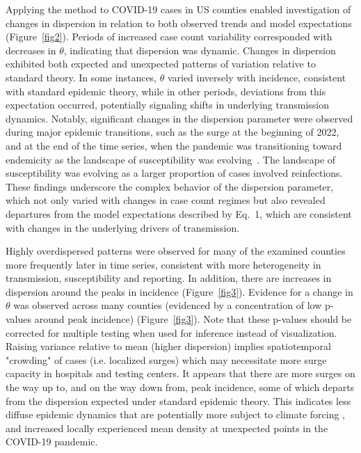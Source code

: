 \documentclass[11pt,letterpaper]{article}
\begin{document}
\begin{Abstract}
Applying the method to COVID-19 cases in US counties enabled investigation of changes in dispersion in relation to both observed trends and model expectations (Figure~\ref{fig2}).  
Periods of increased case count variability corresponded with decreases in $\theta$, indicating that dispersion was dynamic. 
Changes in dispersion exhibited both expected and unexpected patterns of variation relative to standard theory.  
In some instances, $\theta$ varied inversely with incidence, consistent with standard epidemic theory, while in other periods, deviations from this expectation occurred, potentially signaling shifts in underlying transmission dynamics.  
Notably, significant changes in the dispersion parameter were observed during major epidemic transitions, such as the surge at the beginning of 2022, and at the end of the time series, when the pandemic was transitioning toward endemicity as the landscape of susceptibility was evolving~\citep{lavine2021immunological}.  
The landscape of susceptibility was evolving as a larger proportion of cases involved reinfections.  
These findings underscore the complex behavior of the dispersion parameter, which not only varied with changes in case count regimes but also revealed departures from the model expectations described by Eq.~1, which are consistent with changes in the underlying drivers of transmission. 

Highly overdispersed patterns were observed for many of the examined counties more frequently later in time series, consistent with more heterogeneity in transmission, susceptibility and reporting. 
In addition, there are increases in dispersion around the peaks in incidence (Figure~\ref{fig3}).
Evidence for a change in \begin{math}\theta\end{math} was observed across many counties (evidenced by a concentration of low p-values around peak incidence) (Figure~\ref{fig3}). Note that these p-values should be corrected for multiple testing when used for inference instead of visualization.
Raising variance relative to mean (higher dispersion) implies spatiotemporal "crowding" of cases (i.e. localized surges) which may necessitate more surge capacity in hospitals and testing centers. 
It appears that there are more surges on the way up to, and on the way down from, peak incidence, some of which departs from the dispersion expected under standard epidemic theory. 
This indicates less diffuse epidemic dynamics that are potentially more subject to climate forcing \cite{dalziel_urbanization_2018}, and increased locally experienced mean density \cite{lloyd_mean_1967} at unexpected points in the COVID-19 pandemic. 


\end{Abstract}
\end{document}
